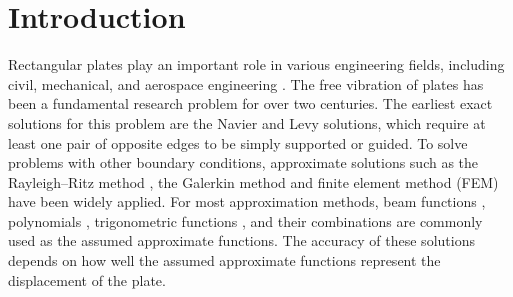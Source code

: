 \documentclass[preprint,12pt,number]{elsarticle}
\begin{document}
\section{Introduction}
Rectangular plates play an important role in various engineering fields, including civil, mechanical, and aerospace engineering \citep{biancolini2005approximate}. 
The free vibration of plates has been a fundamental research problem for over two centuries. 
The earliest exact solutions for this problem are the Navier \citep{navier1823extrait} and Levy \citep{levy1899equilibre} solutions, which require at least one pair of opposite edges to be simply supported or guided.
To solve problems with other boundary conditions, approximate solutions such as the Rayleigh–Ritz method \cite{leissa1973free,lam1989vibration,zhao2025free,jain2024bending,bagheri2024analysis}, the Galerkin method \cite{laura1967study,krysl1995analysis,ma2024analysis,ma2024error,pereira2025modified} and finite element method (FEM) \cite{zhao2024fast,yang2022analysis,paccola2016continuous,carrera2024finite,yang2025semi} have been widely applied. 
For most approximation methods, beam functions \cite{ding1996natural,cheung1999free,cheung1999free2,zhou2002vibrations}, polynomials \cite{bhat1985natural,xie2025efficient,celep2025elastic,madinier2025spatial,sun2023spectral}, trigonometric functions \cite{filipich2000arbitrary,kumar2004buckling,yessenbayeva2019calculation,he2021study,su2022vibration}, and their combinations \cite{li2004vibration,cheung2000vibrations,zhou2001vibrations,monterrubio2015proof,onyeka2022application} are commonly used as the assumed approximate functions.
The accuracy of these solutions depends on how well the assumed approximate functions represent the displacement of the plate.
\end{document}
